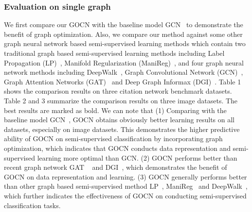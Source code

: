\documentclass{article}
\begin{document}
\subsubsection{Evaluation on single graph}
We first compare our GOCN with the baseline model GCN~\cite{kipf2016semi} to demonstrate the benefit of graph optimization.
Also, we compare our method against some other  graph neural network based semi-supervised learning methods which contain two traditional graph based
semi-supervised learning methods including  Label Propagation (LP)~\cite{zhu2003semi}, Manifold Regularization (ManiReg)~\cite{belkin2006manifold},
and four graph neural network methods including DeepWalk~\cite{perozzi2014deepwalk}, Graph Convolutional Network (GCN)~\cite{kipf2016semi},
Graph Attention Networks (GAT)~\cite{velickovic2017graph} and Deep Graph Informax (DGI)~\cite{DGI}. Table 1 shows the comparison results on three citation network benchmark datasets. Table 2 and 3 summarize the comparison results on three image datasets. The best results are marked as bold.
We can note that
(1) Comparing with the baseline model GCN~\cite{kipf2016semi}, GOCN obtains obviously better learning results on all datasets, especially on image datasets.
This  demonstrates the higher predictive ability  of GOCN on semi-supervised classification  by incorporating graph optimization, which indicates that GOCN conducts data representation and semi-supervised learning more optimal than GCN.
(2) GOCN performs better than recent graph network GAT ~\cite{velickovic2017graph} and DGI~\cite{DGI}, which demonstrates the benefit of GOCN on  data representation and learning.
(3) GOCN generally performs better than other graph based semi-supervised method LP~\cite{zhu2003semi}, ManiReg~\cite{belkin2006manifold}
and DeepWalk~\cite{perozzi2014deepwalk}, which further indicates the effectiveness of GOCN on conducting semi-supervised classification tasks.
\end{document}
